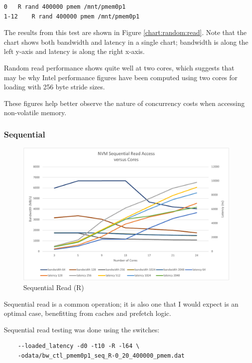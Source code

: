 \begin{verbatim}
0	R rand 400000 pmem /mnt/pmem0p1
1-12	R rand 400000 pmem /mnt/pmem0p1
\end{verbatim}

The results from this test are shown in Figure \ref{chart:random:read}.
Note that the chart shows both bandwidth and latency in a single
chart; bandwidth is along the left y-axis and latency is along the
right x-axis.

Random read performance shows quite well at two cores, which suggests
that may be why Intel performance figures have been computed using two
cores for loading with 256 byte stride sizes.

These figures help better observe the nature of concurrency costs when
accessing non-volatile memory.

\subsubsection{Sequential}\label{mlc:r:seq}

\begin{figure}
    \centering
    \caption{Sequential Read (R)}\label{chart:sequential:read}
    \includegraphics[scale=0.5]{charts/sequential-r-crop.pdf}
\end{figure}

Sequential read is a common operation; it is also one that I would
expect is an optimal case, benefitting from caches and prefetch
logic.

Sequential read testing was done using the switches:

\begin{verbatim}
    --loaded_latency -d0 -t10 -R -l64 \
    -odata/bw_ctl_pmem0p1_seq_R-0_20_400000_pmem.dat
\end{verbatim}

